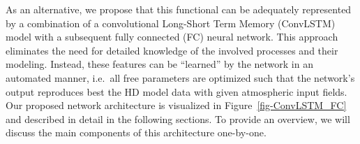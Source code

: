\documentclass[
]{agujournal2019}
\begin{document}
As an alternative, we propose that this functional can be adequately
represented by a combination of a convolutional Long-Short Term Memory
(ConvLSTM) model with a subsequent fully connected (FC) neural network.
This approach eliminates the need for detailed knowledge of the involved
processes and their modeling. Instead, these features can be ``learned''
by the network in an automated manner, i.e.~all free parameters are
optimized such that the network's output reproduces best the HD model
data with given atmospheric input fields. Our proposed network
architecture is visualized in Figure~\ref{fig-ConvLSTM_FC} and described
in detail in the following sections. To provide an overview, we will
discuss the main components of this architecture one-by-one.

\begin{figure}



\end{figure}
\end{document}
